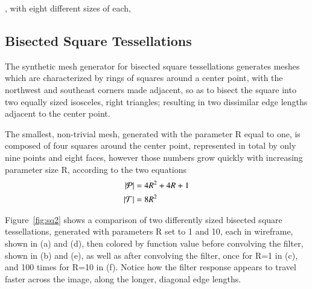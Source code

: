 , with eight different sizes of each,
%
%
%
%
\pagebreak
\subsection{Bisected Square Tessellations}
The synthetic mesh generator for bisected square tessellations generates meshes which are characterized by rings of squares around a center point, with the northwest and southeast corners made adjacent, so as to bisect the square into two equally sized isosceles, right triangles; resulting in two dissimilar edge lengths adjacent to the center point.

The smallest, non-trivial mesh, generated with the parameter R equal to one, is composed of four squares around the center point, represented in total by only nine points and eight faces, however those numbers grow quickly
with increasing parameter size R, according to the two equations
\begin{align}
	|\mathcal{P}| &= 4R^2 + 4R + 1 \\
	|\mathcal{T}| &= 8R^2
	\label{eq:sq2PointAndFaceCounts}
\end{align}


Figure~\ref{fig:sq2} shows a comparison of two differently sized bisected square tessellations, generated with parameters R set to 1 and 10, each in wireframe, shown in (a) and (d), then colored by function value before convolving the filter, shown in (b) and (e), as well as after convolving the filter, once for R=1 in (c), and 100 times for R=10 in (f). Notice how the filter response appears to travel faster across the image, along the longer, diagonal edge lengths.

